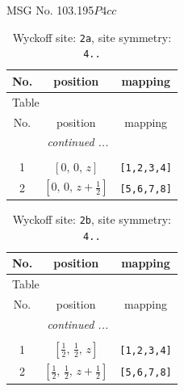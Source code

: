 \documentclass[fleqn,8pt]{jsarticle}
\begin{document}
\setcounter{MaxMatrixCols}{32}

\renewcommand{\tablename}{Table~}
\renewcommand{\figurename}{Figure~}
\begin{center}
\LARGE
MSG No. 103.195\quad$P4cc$
\end{center}
\renewcommand{\arraystretch}{1.2}
\begin{longtable}{ccc}
\caption{Wyckoff site: {\tt 2a}, site symmetry: {\tt 4..}}
 \\
 \hline \hline
No. & position & mapping \\ \hline \endfirsthead

\multicolumn{2}{l}{\tablename\ \thetable{}} \\
 \hline \hline
No. & position & mapping \\ \hline \endhead

 \hline \hline
\multicolumn{2}{r}{\footnotesize\it continued ...} \\ \endfoot

 \hline \hline
\multicolumn{2}{r}{} \\ \endlastfoot

1 & $\left[ 0,\, 0,\, z \right]$ & {\tt [1,2,3,4]} \\ \hline
2 & $\left[ 0,\, 0,\, z + \frac{1}{2} \right]$ & {\tt [5,6,7,8]} \\
\end{longtable}
\renewcommand{\arraystretch}{1.2}
\begin{longtable}{ccc}
\caption{Wyckoff site: {\tt 2b}, site symmetry: {\tt 4..}}
 \\
 \hline \hline
No. & position & mapping \\ \hline \endfirsthead

\multicolumn{2}{l}{\tablename\ \thetable{}} \\
 \hline \hline
No. & position & mapping \\ \hline \endhead

 \hline \hline
\multicolumn{2}{r}{\footnotesize\it continued ...} \\ \endfoot

 \hline \hline
\multicolumn{2}{r}{} \\ \endlastfoot

1 & $\left[ \frac{1}{2},\, \frac{1}{2},\, z \right]$ & {\tt [1,2,3,4]} \\ \hline
2 & $\left[ \frac{1}{2},\, \frac{1}{2},\, z + \frac{1}{2} \right]$ & {\tt [5,6,7,8]} \\
\end{longtable}
\end{document}
